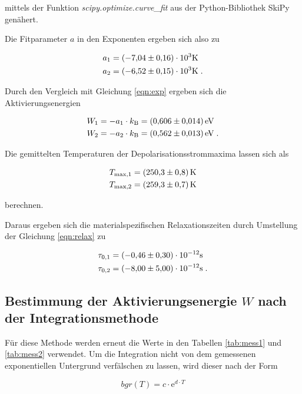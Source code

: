 mittels der Funktion \textit{scipy.optimize.curve\_fit} aus der Python-Bibliothek SkiPy genähert.

Die Fitparameter $a$ in den Exponenten ergeben sich also zu

\begin{align*}
  a_1 &= (\num{-7.04 +- 0.16})\cdot 10^3 \si{\kelvin} \\
  a_2 &= (\num{-6.52 +- 0.15})\cdot 10^3 \si{\kelvin} \; .
\end{align*}

Durch den Vergleich mit Gleichung \eqref{eqn:exp} ergeben sich die Aktivierungsenergien

\begin{align*}
  W_1 &= -a_1 \cdot k_\text{B} = \SI{0.606 +- 0.014}{\eV} \\
  W_2 &= -a_2 \cdot k_\text{B} = \SI{0.562 +- 0.013}{\eV}  \; .
\end{align*}

Die gemittelten Temperaturen der Depolarisationsstrommaxima lassen sich als

\begin{align*}
  T_\text{max,1} &= \SI{250.3 +- 0.8}{\kelvin} \\
  T_\text{max,2} &= \SI{259.3 +- 0.7}{\kelvin}
\end{align*}

berechnen.

Daraus ergeben sich die materialspezifischen Relaxationszeiten durch Umstellung der Gleichung \eqref{eqn:relax} zu

\begin{align*}
  \tau_{0,1} &= (\num{-0.46 +- 0.30}) \cdot 10^{-12} \si{\second}\\
  \tau_{0,2} &= (\num{-8.00 +- 5.00}) \cdot 10^{-12} \si{\second} \; .
\end{align*}

\subsection{Bestimmung der Aktivierungsenergie $W$ nach der Integrationsmethode}

Für diese Methode werden erneut die Werte in den Tabellen \ref{tab:mess1} und \ref{tab:mess2} verwendet.
Um die Integration nicht von dem gemessenen exponentiellen Untergrund verfälschen zu lassen, wird dieser 
nach der Form 

\begin{equation}
  bgr(T) = c \cdot \text{e}^{d \cdot T}
\end{equation}

